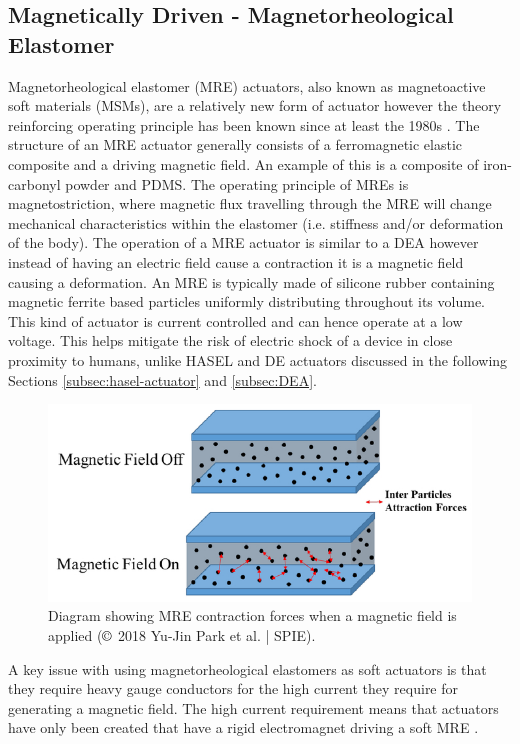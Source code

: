 \subsection{Magnetically Driven - Magnetorheological Elastomer}
Magnetorheological elastomer (MRE) actuators, also known as magnetoactive soft materials (MSMs), are a relatively new form of actuator however the theory reinforcing operating principle has been known since at least the 1980s \citep{Jolly1996}. The structure of an MRE actuator generally consists of a ferromagnetic elastic composite and a driving magnetic field. An example of this is a composite of iron-carbonyl powder and PDMS. The operating principle of MREs is magnetostriction, where magnetic flux travelling through the MRE will change mechanical characteristics within the elastomer (i.e. stiffness and/or deformation of the body). The operation of a MRE actuator is similar to a DEA however instead of having an electric field cause a contraction it is a magnetic field causing a deformation. An MRE is typically made of silicone rubber containing magnetic ferrite based particles uniformly distributing throughout its volume. This kind of actuator is current controlled and can hence operate at a low voltage. This helps mitigate the risk of electric shock of a device in close proximity to humans, unlike HASEL and DE actuators discussed in the following Sections \ref{subsec:hasel-actuator} and \ref{subsec:DEA}.
\begin{figure}[H]
  \centering
  \includegraphics[width=0.6\linewidth]{Figures/MRE_actuate.jpg} %
  \caption{Diagram showing MRE contraction forces when a magnetic field is applied \citep{Park2018a} ($\copyright$ 2018 Yu-Jin Park et al. | SPIE).}
  \label{fig:Artificial Muscle_MRE}
\end{figure}
A key issue with using magnetorheological elastomers as soft actuators is that they require heavy gauge conductors for the high current they require for generating a magnetic field. The high current requirement means that actuators have only been created that have a rigid electromagnet driving a soft MRE \citep{Bose2012}. 

